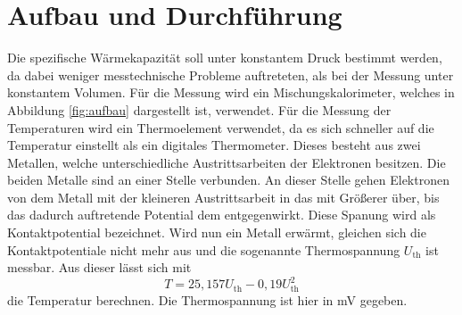 \section{Aufbau und Durchführung}
\label{sec:durchfuehrung}
Die spezifische Wärmekapazität soll unter konstantem Druck bestimmt werden, da dabei weniger messtechnische Probleme auftreteten, als bei der Messung unter konstantem Volumen.
Für die Messung wird ein Mischungskalorimeter, welches in Abbildung \ref{fig:aufbau} dargestellt ist, verwendet.
Für die Messung der Temperaturen wird ein Thermoelement verwendet, da es sich schneller auf die Temperatur einstellt als ein digitales Thermometer. Dieses besteht aus zwei Metallen, welche unterschiedliche Austrittsarbeiten der Elektronen besitzen. Die beiden Metalle sind an einer Stelle verbunden. An dieser Stelle gehen Elektronen von dem Metall mit der kleineren Austrittsarbeit in das mit Größerer über, bis das dadurch auftretende Potential dem entgegenwirkt. Diese Spanung wird als Kontaktpotential bezeichnet. Wird nun ein Metall erwärmt, gleichen sich die Kontaktpotentiale nicht mehr aus und die sogenannte Thermospannung $U_\mathrm{th}$ ist messbar.
Aus dieser lässt sich mit
\begin{equation}
  T = 25,157 U_\mathrm{th} - 0,19 U_\mathrm{th}^2
\end{equation}
die Temperatur berechnen. Die Thermospannung ist hier in \si{\milli\volt} gegeben.

